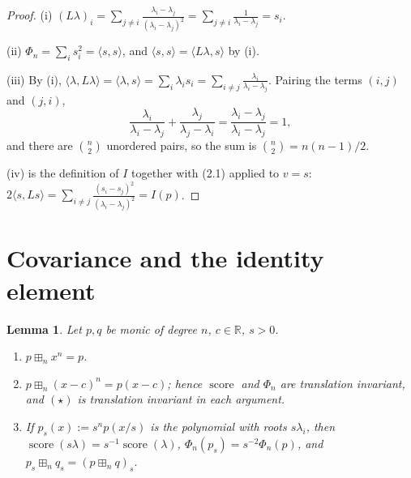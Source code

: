 \documentclass[12pt]{article}
\newtheorem{lemma}{Lemma}
\theoremstyle{remark}
\DeclareMathOperator{\score}{score}
\newcommand{\bR}{\mathbb{R}}
\newcommand{\boxp}{\boxplus_n}
\newcommand{\inner}[2]{\langle #1,#2\rangle}
\begin{document}
\begin{proof}
(i) $(L\lambda)_i=\sum_{j\neq i}\frac{\lambda_i-\lambda_j}{(\lambda_i-\lambda_j)^2}
=\sum_{j\neq i}\frac{1}{\lambda_i-\lambda_j}=s_i$.

(ii) $\Phi_n=\sum_i s_i^2=\inner{s}{s}$, and $\inner{s}{s}=\inner{L\lambda}{s}$
by (i).

(iii) By (i), $\inner{\lambda}{L\lambda}=\inner{\lambda}{s}
=\sum_i\lambda_is_i=\sum_{i\neq j}\frac{\lambda_i}{\lambda_i-\lambda_j}$.
Pairing the terms $(i,j)$ and $(j,i)$,
\[
\frac{\lambda_i}{\lambda_i-\lambda_j}+\frac{\lambda_j}{\lambda_j-\lambda_i}
=\frac{\lambda_i-\lambda_j}{\lambda_i-\lambda_j}=1,
\]
and there are $\binom n2$ unordered pairs, so the sum is $\binom n2=n(n-1)/2$.

(iv) is the definition of $I$ together with (2.1) applied to $v=s$:
$2\inner{s}{Ls}=\sum_{i\neq j}\frac{(s_i-s_j)^2}{(\lambda_i-\lambda_j)^2}=I(p)$.
\end{proof}

\section{Covariance and the identity element}\label{sec:cov}

\begin{lemma}\label{lem:cov}
Let $p,q$ be monic of degree $n$, $c\in\bR$, $s>0$.
\begin{enumerate}
\item[(i)] $p\boxp x^n=p$.
\item[(ii)] $p\boxp (x-c)^n=p(x-c)$; hence $\score$ and $\Phi_n$ are
translation invariant, and $(\star)$ is translation invariant in each argument.
\item[(iii)] If $p_s(x):=s^{n}p(x/s)$ is the polynomial with roots $s\lambda_i$,
then $\score(s\lambda)=s^{-1}\score(\lambda)$, $\Phi_n(p_s)=s^{-2}\Phi_n(p)$,
and $p_s\boxp q_s=(p\boxp q)_s$.
\end{enumerate}
\end{lemma}
\end{document}
